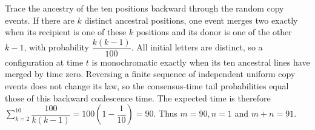 Trace the ancestry of the ten positions backward through the random copy events. If there are $k$ distinct ancestral positions, one event merges two exactly when its recipient is one of these $k$ positions and its donor is one of the other $k-1$, with probability $\dfrac{k (k-1)}{100}$. All initial letters are distinct, so a configuration at time $t$ is monochromatic exactly when its ten ancestral lines have merged by time zero. Reversing a finite sequence of independent uniform copy events does not change its law, so the consensus-time tail probabilities equal those of this backward coalescence time. The expected time is therefore $\sum_{k=2}^{10} \dfrac{100}{k(k-1)} = 100 (1 - \dfrac{1}{10}) = 90$. Thus $m=90,n=1$ and $\boxed{m+n=91}$.

